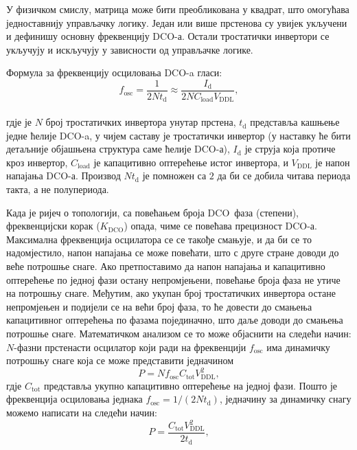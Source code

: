 \documentclass[master]{finthesis}
\def \DCO  {DCO} %
\begin{document}
У физичком смислу, матрица може бити преобликована у квадрат, што омогућава једноставнију управљачку логику. Један или више прстенова су увијек укључени и дефинишу основну фреквенцију \DCO-а. Остали тростатички инвертори се укључују и искључују у зависности од управљачке логике. \par
Формула за фреквенцију осциловања \DCO-a гласи:
\begin{equation} \label{f_osc}
    f_\text{osc} = \dfrac{1}{2Nt_\text{d}} \approx \dfrac{I_\text{d}}{2NC_\text{load}V_\text{DDL}},
\end{equation} \\
гдје је $N$ број тростатичких инвертора унутар прстена, $t_\text{d}$ представља кашњење једне ћелије \DCO-a, у чијем саставу је тростатички инвертор (у наставку ће бити детаљније објашњена структура саме ћелије \DCO-а), $I_\text{d}$ је струја која протиче кроз инвертор, $C_\text{load}$ је капацитивно оптерећење истог инвертора, и $V_\text{DDL}$ је напон напајања \DCO-а. Производ $Nt_\text{d}$ је помножен са $2$ да би се добила читава периода такта, а не полупериода. \par
Када је ријеч о топологији, са повећањем броја \DCO\ фаза (степени), фреквенцијски корак ($K_\text{DCO}$) опада, чиме се повећава прецизност \DCO-а. Максимална фреквенција осцилатора се се такође смањује, и да би се то надомјестило, напон напајања се може повећати, што с друге стране доводи до веће потрошње снаге. Ако претпоставимо да напон напајања и капацитивно оптерећење по једној фази остану непромјењени, повећање броја фаза не утиче на потрошњу снаге. Међутим, ако укупан број тростатичких инвертора остане непромјењен и подијели се на већи број фаза, то ће довести до смањења капацитивног оптерећења по фазама појединачно, што даље доводи до смањења потрошње снаге. Математичком анализом се то може објаснити на следећи начин: $N$-фазни прстенасти осцилатор који ради на фреквенцији $f_\text{osc}$ има динамичку потрошњу снаге која се може представити једначином
\begin{equation} 
	\label{eq:dco:dynamic_pwr_1}
    	P = N f_\text{osc} C_\text{tot} V^{2}_\text{DDL}, 
\end{equation}
гдје $C_\text{tot}$ представља укупно капацитивно оптерећење на једној фази. Пошто је фреквенција осциловања једнака $f_\text{osc} = 1/(2Nt_\text{d})$, једначину за динамичку снагу можемо написати на следећи начин:
\begin{equation}
    	P = \frac{C_\text{tot}V^{2}_\text{DDL}}{2t_\text{d}},
\end{equation}
\end{document}
